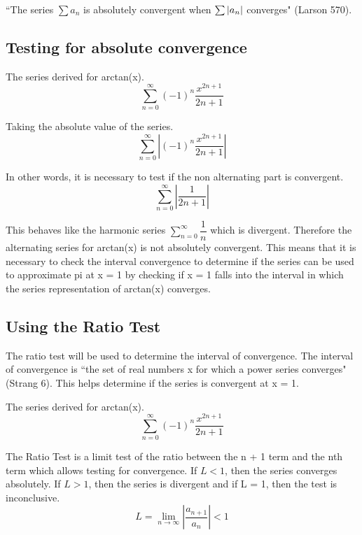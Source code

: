 \documentclass[12pt, titlepage]{article}
\begin{document}
``The series \(\sum a_{n}\) is absolutely convergent when \(\sum \abs{a_{n}}\) converges" (Larson 570).

\subsection{Testing for absolute convergence}
The series derived for arctan(x).
\begin{equation}
    \sum_{n=0}^{\infty} (-1)^{n} \frac{x^{2n+1}}{2n+1}
\end{equation}

Taking the absolute value of the series.
\begin{equation}
    \sum_{n=0}^{\infty}   \left |  (-1)^{n} \frac{x^{2n+1}}{2n+1} \right |
\end{equation}

In other words, it is necessary to test if the non alternating part is convergent.
\begin{equation}
    \sum_{n=0}^{\infty}   \left |\frac{1}{2n+1} \right |
\end{equation}

This behaves like the harmonic series \(\sum\limits_{n=0}^{\infty} \dfrac{1}{n}\) which is divergent. Therefore the alternating series for arctan(x) is not absolutely convergent. This means that it is necessary to check the interval convergence to determine if the series can be used to approximate pi at x = 1 by checking if x = 1 falls into the interval in which the series representation of arctan(x) converges.

\subsection{Using the Ratio Test}
The ratio test will be used to determine the interval of convergence. The interval of convergence is ``the set of real numbers x for which a power series converges" (Strang 6). This helps determine if the series is convergent at x = 1.

The series derived for arctan(x).
\begin{equation}
    \sum_{n=0}^{\infty} (-1)^{n} \frac{x^{2n+1}}{2n+1}
\end{equation}
 
The Ratio Test is a limit test of the ratio between the n + 1 term and the nth term which allows testing for convergence. If \(L < 1\), then the series converges absolutely. If \(L > 1\), then the series is divergent and if L = 1, then the test is inconclusive.
\begin{equation}
    L = \lim_{n \to \infty} \left |\frac{a_{n+1}}{a_{n}} \right | < 1
\end{equation}
\end{document}
